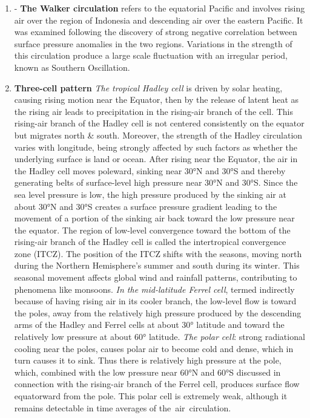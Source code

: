 \begin{enumerate}
	\item - \textbf{The Walker circulation} refers to the equatorial Pacific and involves rising air over the region of Indonesia and descending air over the eastern Pacific. It was examined following the discovery of strong negative correlation between surface pressure anomalies in the two regions.
	      Variations in the strength of this circulation produce a large scale fluctuation with an irregular period, known as Southern Oscillation.

	\item \textbf{Three-cell pattern}
	      \newline \textit{The tropical Hadley cell} is driven by solar heating, causing rising motion near the Equator, then by the release of latent heat as the rising air leads to precipitation in the rising-air branch of the cell. This rising-air branch of the Hadley cell is not centered consistently on the equator but migrates north \& south.
	      Moreover, the strength of the Hadley circulation varies with longitude, being strongly affected by such factors as whether the underlying surface is land or ocean. After rising near the Equator, the air in the Hadley cell moves poleward, sinking near 30°N and 30°S and thereby generating belts of surface-level high pressure near 30°N and 30°S. Since the sea level pressure is low, the high pressure produced by the sinking air at about 30°N and 30°S creates a surface pressure gradient leading to the movement of a portion of the sinking air back toward the low pressure near the equator. The region of low-level convergence toward the bottom of the rising-air branch of the Hadley cell is called the intertropical convergence zone (ITCZ). The position of the ITCZ shifts with the seasons, moving north during the Northern Hemisphere’s summer and south during its winter. This seasonal movement affects global wind and rainfall patterns, contributing to phenomena like monsoons.
	      \newline \textit{In the mid-latitude Ferrel cell}, termed indirectly because of having rising air in its cooler branch, the low-level flow is toward the poles, away from the relatively high pressure produced by the descending arms of the Hadley and Ferrel cells at about 30° latitude and toward the relatively low pressure at about 60° latitude.
	      \newline \textit{The polar cell}: strong radiational cooling near the poles, causes polar air to become cold and dense, which in turn causes it to sink. Thus there is relatively high pressure at the pole, which, combined with the low pressure near 60°N and 60°S discussed in connection with the rising-air branch of the Ferrel cell, produces surface flow equatorward from the pole. This polar cell is extremely weak, although it remains detectable in time averages of the air circulation.

\end{enumerate}

